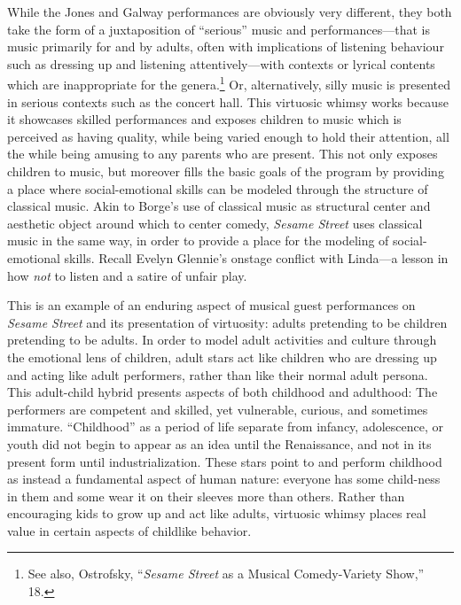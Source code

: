 \documentclass[12pt,letterpaper]{article}
\newcommand{\ses}{\textit{Sesame Street }}
\begin{document}
        While the Jones and Galway performances are obviously very different, 
	they both take the form of a juxtaposition of ``serious'' music and 
	performances---that is music primarily for and by adults, often with
	implications of listening behaviour such as dressing up and listening 
	attentively---with contexts or lyrical contents which are inappropriate 
	for the genera.\footnote{See also, Ostrofsky,  ``\textit{Sesame Street}
	as a Musical Comedy-Variety Show,'' 18.} Or, alternatively, silly music
	is presented in serious contexts such as the concert hall. This 
	virtuosic whimsy 
	works because it showcases skilled performances and exposes children to
	music which is perceived as having quality, while being varied enough 
	to hold their attention, all the while being amusing to any parents who 
	are present. This not only exposes children to music, but moreover fills
	the basic goals of the program by providing a place where 
	social-emotional skills can be modeled through the structure of
	classical music. Akin to Borge's use of classical music as structural
	center and aesthetic object around which to center comedy, \ses 
	uses classical music in the same way, in order to provide a place for
	the modeling of social-emotional skills. Recall Evelyn Glennie's 
	onstage conflict with Linda---a lesson in how \textit{not} to listen
	and a satire of unfair play. 

	This is an example of an enduring aspect of musical guest performances
	on \textit{Sesame Street} and its presentation of virtuosity: adults 
	pretending to be children pretending
	to be adults. In order to model adult activities and culture through the
	emotional lens of children, adult stars act like children who are 
	dressing up and acting like adult performers, rather than like their
	normal adult persona. This adult-child hybrid 
	presents aspects of both childhood and adulthood: The performers are 
	competent and skilled, yet vulnerable, curious, and sometimes immature.  
	``Childhood'' as a period of life separate from infancy, adolescence, 
	or youth did not begin to appear as an idea until the Renaissance, and
	not in its present form until industrialization.\autocite[13]{Illich}
	These stars point to and perform childhood as instead a fundamental 
	aspect of human nature: everyone has some child-ness in them and some
	wear it on their sleeves more than others. Rather than encouraging
	kids to grow up and act like adults, virtuosic whimsy places real value
	in certain aspects of childlike behavior.
\end{document}
